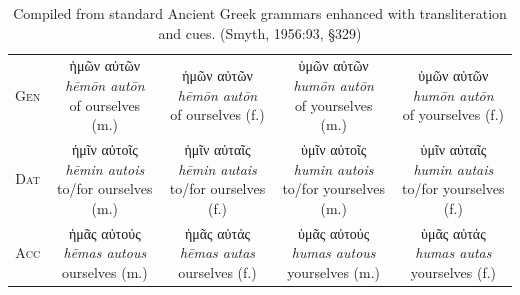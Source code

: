 \documentclass[10pt,a4paper,notitlepage]{article}
\newcommand{\tsc}[1]{\textsc{#1}}
\newcommand*{\grc}[1]{\fontspec{Inter}#1\rmfamily}
\newcommand{\trc}[1]{\textit{\fontspec{Tinos}#1}}
\begin{document}
\begin{table}[H]
\begin{tabular}{c|cc|cc}
            \tsc{Gen} & \makecell{\grc{ἡμῶν αὐτῶν} \\ \trc{hēmōn autōn} \\ \small of ourselves (m.)}
             & \makecell{\grc{ἡμῶν αὐτῶν} \\ \trc{hēmōn autōn} \\ \small of ourselves (f.)}
             & \makecell{\grc{ὑμῶν αὐτῶν} \\ \trc{humōn autōn} \\ \small of yourselves (m.)}
             & \makecell{\grc{ὑμῶν αὐτῶν} \\ \trc{humōn autōn} \\ \small of yourselves (f.)} \\

            \tsc{Dat} & \makecell{\grc{ἡμῖν αὐτοῖς} \\ \trc{hēmin autois} \\ \small to/for ourselves (m.)}
             & \makecell{\grc{ἡμῖν αὐταῖς} \\ \trc{hēmin autais} \\ \small to/for ourselves (f.)}
             & \makecell{\grc{ὑμῖν αὐτοῖς} \\ \trc{humin autois} \\ \small to/for yourselves (m.)}
             & \makecell{\grc{ὑμῖν αὐταῖς} \\ \trc{humin autais} \\ \small to/for yourselves (f.)}\\

            \tsc{Acc} & \makecell{\grc{ἡμᾶς αὐτούς} \\ \trc{hēmas autous} \\ \small ourselves (m.)}
             & \makecell{\grc{ἡμᾶς αὐτάς} \\ \trc{hēmas autas} \\ \small ourselves (f.)}
             & \makecell{\grc{ὑμᾶς αὐτούς} \\ \trc{humas autous} \\ \small yourselves (m.)}
             & \makecell{\grc{ὑμᾶς αὐτάς} \\ \trc{humas autas} \\ \small yourselves (f.)}\\
        \end{tabular}
        \caption{Compiled from standard Ancient Greek grammars enhanced with transliteration and cues. (Smyth, 1956:93, \S329)}
    \end{table}
\end{document}

